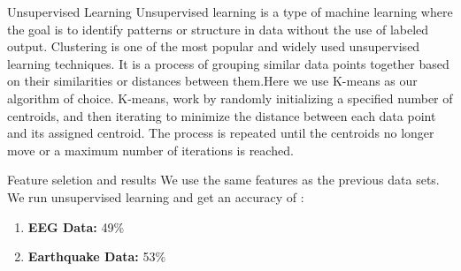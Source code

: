 \begin{frame}{Unsupervised Learning}
    Unsupervised learning is a type of machine learning where the goal is to identify patterns or structure in data without the use of labeled output. Clustering is one of the most popular and widely used unsupervised learning techniques. It is a process of grouping similar data points together based on their similarities or distances between them.\pause Here we use K-means as our algorithm of choice.  K-means, work by randomly initializing a specified number of centroids, and then iterating to minimize the distance between each data point and its assigned centroid. The process is repeated until the centroids no longer move or a maximum number of iterations is reached.
\end{frame}

\begin{frame}{Feature seletion and results}
We use the same features as the previous data sets.\pause
We run unsupervised learning and get an accuracy of :
\begin{enumerate}[$\bullet$]
    \item \textbf{EEG Data:} 49\%
    \item  \textbf{Earthquake Data:} 53\%
\end{enumerate}    
\end{frame}